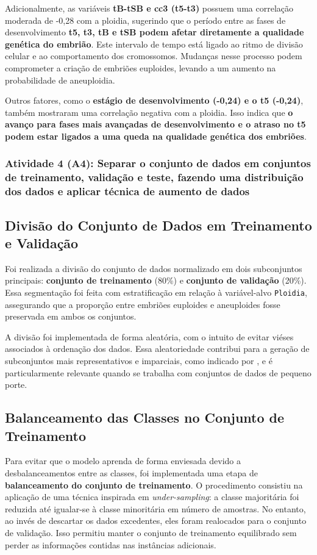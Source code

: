 Adicionalmente, as variáveis \textbf{tB-tSB e cc3 (t5-t3)} possuem uma correlação moderada de -0,28 com a ploidia, sugerindo que o período entre as fases de desenvolvimento \textbf{t5, t3, tB e tSB podem afetar diretamente a qualidade genética do embrião}. Este intervalo de tempo está ligado ao ritmo de divisão celular e ao comportamento dos cromossomos. Mudanças nesse processo podem comprometer a criação de embriões euploides, levando a um aumento na probabilidade de aneuploidia. 

Outros fatores, como o \textbf{estágio de desenvolvimento (-0,24) e o t5 (-0,24)}, também mostraram uma correlação negativa com a ploidia. Isso indica que \textbf{o avanço para fases mais avançadas de desenvolvimento e o atraso no t5 podem estar ligados a uma queda na qualidade genética dos embriões}. 

\subsubsection{Atividade 4 (A4): Separar o conjunto de dados em conjuntos de treinamento, validação e teste, fazendo uma distribuição dos dados e aplicar técnica de aumento de dados}

\subsection*{Divisão do Conjunto de Dados em Treinamento e Validação}

Foi realizada a divisão do conjunto de dados normalizado em dois subconjuntos principais: \textbf{conjunto de treinamento} (80\%) e \textbf{conjunto de validação} (20\%). Essa segmentação foi feita com estratificação em relação à variável-alvo \texttt{Ploidia}, assegurando que a proporção entre embriões euploides e aneuploides fosse preservada em ambos os conjuntos.

A divisão foi implementada de forma aleatória, com o intuito de evitar viéses associados à ordenação dos dados. Essa aleatoriedade contribui para a geração de subconjuntos mais representativos e imparciais, como indicado por , e é particularmente relevante quando se trabalha com conjuntos de dados de pequeno porte.

\subsection*{Balanceamento das Classes no Conjunto de Treinamento}
Para evitar que o modelo aprenda de forma enviesada devido a desbalanceamentos entre as classes, foi implementada uma etapa de \textbf{balanceamento do conjunto de treinamento}. O procedimento consistiu na aplicação de uma técnica inspirada em \textit{under-sampling}: a classe majoritária foi reduzida até igualar-se à classe minoritária em número de amostras. No entanto, ao invés de descartar os dados excedentes, eles foram realocados para o conjunto de validação. Isso permitiu manter o conjunto de treinamento equilibrado sem perder as informações contidas nas instâncias adicionais.


